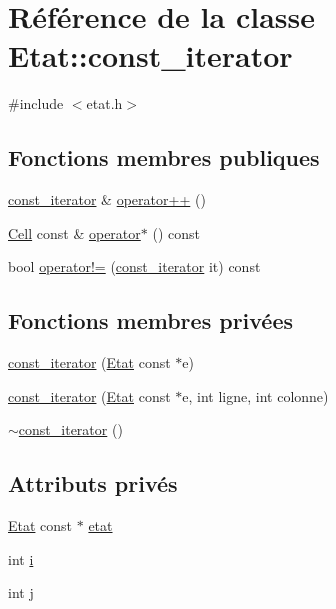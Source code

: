 \hypertarget{class_etat_1_1const__iterator}{}\section{Référence de la classe Etat\+:\+:const\+\_\+iterator}
\label{class_etat_1_1const__iterator}


{\ttfamily \#include $<$etat.\+h$>$}

\subsection*{Fonctions membres publiques}
\begin{DoxyCompactItemize}
\item 
\mbox{\hyperlink{class_etat_1_1const__iterator}{const\+\_\+iterator}} \& \mbox{\hyperlink{class_etat_1_1const__iterator_a15cb0937b31235e6cf68023792202bc3}{operator++}} ()
\item 
\mbox{\hyperlink{class_cell}{Cell}} const  \& \mbox{\hyperlink{class_etat_1_1const__iterator_aea6521664f712dd1a464a36fddbb72a8}{operator$\ast$}} () const
\item 
bool \mbox{\hyperlink{class_etat_1_1const__iterator_a4c28869008c01cf2c643ae2f6a43795d}{operator!=}} (\mbox{\hyperlink{class_etat_1_1const__iterator}{const\+\_\+iterator}} it) const
\end{DoxyCompactItemize}
\subsection*{Fonctions membres privées}
\begin{DoxyCompactItemize}
\item 
\mbox{\hyperlink{class_etat_1_1const__iterator_ae5a815d5f85c30947c23ed7ac183d1f0}{const\+\_\+iterator}} (\mbox{\hyperlink{class_etat}{Etat}} const $\ast$e)
\item 
\mbox{\hyperlink{class_etat_1_1const__iterator_a4cfe1559f1698f877a658d8e86a59cc2}{const\+\_\+iterator}} (\mbox{\hyperlink{class_etat}{Etat}} const $\ast$e, int ligne, int colonne)
\item 
\mbox{\hyperlink{class_etat_1_1const__iterator_a62803f9835ef0500a98d474d0caa3c05}{$\sim$const\+\_\+iterator}} ()
\end{DoxyCompactItemize}
\subsection*{Attributs privés}
\begin{DoxyCompactItemize}
\item 
\mbox{\hyperlink{class_etat}{Etat}} const  $\ast$ \mbox{\hyperlink{class_etat_1_1const__iterator_af918bbe481178fddf815395fa29d8e87}{etat}}
\item 
int \mbox{\hyperlink{class_etat_1_1const__iterator_ac1cea9ec2a0e81b9f8edbfd966be26c9}{i}}
\item 
int \mbox{\hyperlink{class_etat_1_1const__iterator_a38164bceb9cdd73c8bb7d989008f03d2}{j}}
\end{DoxyCompactItemize}
